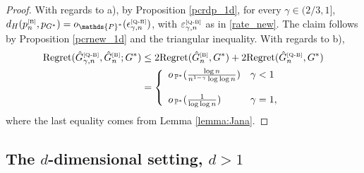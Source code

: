 \documentclass[twoside,12pt]{article}
\newcommand{\PP}{\mathds{P}}
\begin{document}
\begin{proof} 
With regards to a), by Proposition \ref{pcrdp_1d}, for every $\gamma\in (2/3,1]$, $d_H(p_n^{\text{\tiny{[B]}}},p_{G^\ast})=o_{\PP^\ast}(\epsilon_{\gamma,n}^{\text{\tiny{[Q-B]}}})$, with $\varepsilon_{\gamma,n}^{\text{\tiny{[Q-B]}}}$ as in \eqref{rate_new}. The claim follows by Proposition \ref{pcrnew_1d} and the triangular inequality. With regards to b),
 \begin{align*}
     \text{Regret}(\hat G_{\gamma,n}^{\text{\tiny{[Q-B]}}},\hat G_{n}^{\text{\tiny{[B]}}};G^{\ast})
      &\leq 2\text{Regret}(\hat G_{n}^{\text{\tiny{[B]}}},G^\ast)+2\text{Regret}(\hat G_{n}^{\text{\tiny{[Q-B]}}},G^\ast)\\
    & =
      \left\{
\begin{array}{ll}
o_{\,\mathbb{P}^{\ast}}(\frac{\log n}{n^{1-\gamma}\log\log n})&\gamma <1\\
\\
o_{\,\mathbb{P}^{\ast}}(\frac{1}{\log\log n})&\gamma =1,
\end{array}
\right.
\end{align*}
where the last equality comes from Lemma \ref{lemma:Jana}.
\end{proof}

\subsection{The $d$-dimensional setting, $d>1$}
\end{document}
